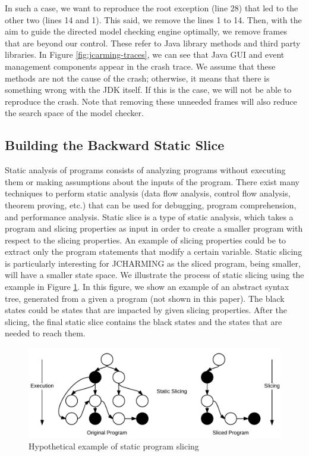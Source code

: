 \documentclass[12pt]{report}
\begin{document}
In such a case, we want to reproduce the root exception (line 28) that
led to the other two (lines 14 and 1). This said, we remove the lines 1
to 14. Then, with the aim to guide the directed model checking engine
optimally, we remove frames that are beyond our control. These refer to
Java library methods and third party libraries. In Figure
\ref{fig:jcarming-traces}, we can see that Java GUI and event management
components appear in the crash trace. We assume that these methods are
not the cause of the crash; otherwise, it means that there is something
wrong with the JDK itself. If this is the case, we will not be able to
reproduce the crash. Note that removing these unneeded frames will also
reduce the search space of the model checker.

\subsection{Building the Backward Static
Slice}\label{building-the-backward-static-slice}

Static analysis of programs consists of analyzing programs without
executing them or making assumptions about the inputs of the program.
There exist many techniques to perform static analysis (data flow
analysis, control flow analysis, theorem proving, etc.) that can be used
for debugging, program comprehension, and performance analysis. Static
slice is a type of static analysis, which takes a program and slicing
properties as input in order to create a smaller program with respect to
the slicing properties. An example of slicing properties could be to
extract only the program statements that modify a certain variable.
Static slicing is particularly interesting for JCHARMING as the sliced
program, being smaller, will have a smaller state space. We illustrate
the process of static slicing using the example in Figure
\ref{fig:slicing}. In this figure, we show an example of an abstract
syntax tree, generated from a given a program (not shown in this paper).
The black states could be states that are impacted by given slicing
properties. After the slicing, the final static slice contains the black
states and the states that are needed to reach them.

\begin{figure}
  \centering
    \includegraphics[scale=.2]{media/chap8/slicing.png}
    \caption{Hypothetical example of static program slicing\label{fig:slicing}}
\end{figure}
\end{document}
